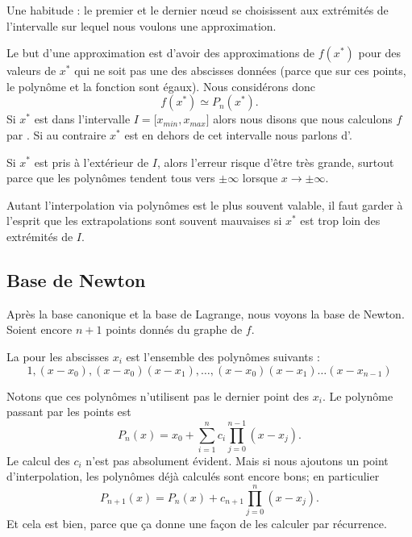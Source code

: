 \begin{normaltext}
    Une habitude : le premier et le dernier nœud se choisissent aux extrémités de l'intervalle sur lequel nous voulons une approximation.

    Le but d'une approximation est d'avoir des approximations de \( f(x^*)\) pour des valeurs de \( x^*\) qui ne soit pas une des abscisses données (parce que sur ces points, le polynôme et la fonction sont égaux). Nous considérons donc
    \begin{equation}
        f(x^*)\simeq P_n(x^*).
    \end{equation}
    Si \( x^*\) est dans l'intervalle \( I= \mathopen[ x_{min} , x_{max} \mathclose]\) alors nous disons que nous calculons \( f\) par . Si au contraire \( x^*\) est en dehors de cet intervalle nous parlons d'.

    Si \( x^*\) est pris à l'extérieur de \( I\), alors l'erreur risque d'être très grande, surtout parce que les polynômes tendent tous vers \( \pm\infty\) lorsque \( x\to \pm\infty\).

    Autant l'interpolation via polynômes est le plus souvent valable, il faut garder à l'esprit que les extrapolations sont souvent mauvaises si \( x^*\) est trop loin des extrémités de \( I\).
\end{normaltext}

\subsection{Base de Newton}

Après la base canonique et la base de Lagrange, nous voyons la base de Newton. Soient encore \( n+1\) points donnés du graphe de \( f\).

\begin{definition}
    La  pour les abscisses \( x_i\) est l'ensemble des polynômes suivants :
    \begin{equation}
        1,(x-x_0),(x-x_0)(x-x_1),\ldots,(x-x_0)(x-x_1)\ldots (x-x_{n-1})
    \end{equation}
\end{definition}
Notons que ces polynômes n'utilisent pas le dernier point des \( x_i\). Le polynôme passant par les points est
\begin{equation}
    P_n(x)=x_0+\sum_{i=1}^nc_i\prod_{j=0}^{n-1}(x-x_j).
\end{equation}
Le calcul des \( c_i\) n'est pas absolument évident. Mais si nous ajoutons un point d'interpolation, les polynômes déjà calculés sont encore bons; en particulier
\begin{equation}
    P_{n+1}(x)=P_n(x)+c_{n+1}\prod_{j=0}^{n}(x-x_j).
\end{equation}
Et cela est bien, parce que ça donne une façon de les calculer par récurrence.

